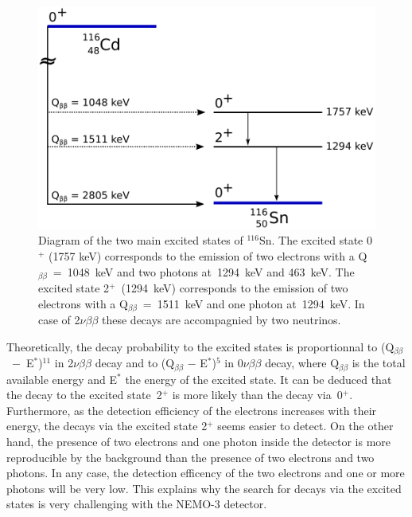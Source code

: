 \documentclass[main.tex]{subfiles}
\begin{document}
\begin{figure} [h!]
\begin{center}
\includegraphics[scale=0.60]{pictures/Chap6/SchemaCdExcitedState.pdf}
\end{center}
\caption{Diagram of the two main excited states of $^{\text{116}}$Sn. The excited state 0$^+$ (1757 keV) corresponds to the emission of two electrons with a Q$_{\beta\beta}$~=~1048~keV and two photons at~1294~keV and 463~keV. The excited state 2$^+$~(1294~keV) corresponds to the emission of two electrons with a Q$_{\beta\beta}$~=~1511~keV and one photon at~1294~keV. In case of 2$\nu\beta\beta$ these decays are accompagnied by two neutrinos.}
\label{SchemaExcitedState}
\end{figure}



\NI Theoretically, the decay probability to the excited states is proportionnal to (Q$_{\beta\beta}$~$-$~E$^*$)$^{\text{11}}$ in 2$\nu\beta\beta$ decay and to (Q$_{\beta\beta}$ $-$ E$^*$)$^{\text{5}}$ in 0$\nu\beta\beta$ decay, where Q$_{\beta\beta}$ is the total available energy and E$^*$ the energy of the excited state. It can be deduced that the decay to the excited state~2$^+$ is more likely than the decay via~0$^+$. Furthermore, as the detection efficiency of the electrons increases with their energy, the decays via the excited state 2$^+$ seems easier to detect. On the other hand, the presence of two electrons and one photon inside the detector is more reproducible by the background than the presence of two electrons and two photons. In any case, the detection efficency of the two electrons and one or more photons will be very low. This explains why the search for decays via the excited states is very challenging with the NEMO-3 detector.
\end{document}
